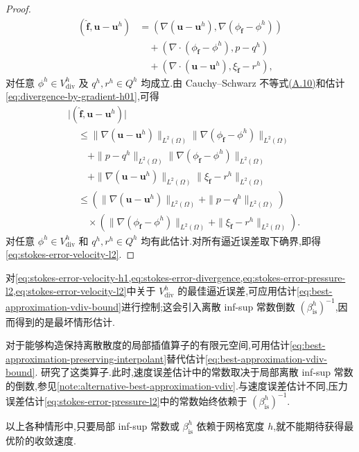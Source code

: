 \begin{proof}
\begin{equation}
\begin{aligned}
  (\widehat{\bm{f}},\bm{u}-\bm{u}^h)
  &= (\nabla(\bm{u}-\bm{u}^h),
      \nabla(\phi_{\widehat{\bm{f}}}-\phi^h))\\
  &\quad +(\nabla\cdot(\phi_{\widehat{\bm{f}}}
                    -\phi^h),p-q^h)\\
  &\quad +(\nabla\cdot(\bm{u}-\bm{u}^h),
           \xi_{\widehat{\bm{f}}}-r^h),
\end{aligned}
\end{equation}
对任意 $\phi^h\in V_{\mathrm{div}}^h$ 及 $q^h,r^h\in Q^h$ 均成立.由 Cauchy--Schwarz 不等式\hyperref[eq:appendix-a-10]{(A.10)}和估计\cref{eq:divergence-by-gradient-h01},可得
\begin{equation}\label{eq:stokes-error-velocity-l2-bound}
\begin{aligned}
  &\bigl|(\widehat{\bm{f}},\bm{u}-\bm{u}^h)\bigr|\\
  &\quad\leq
    \|\nabla(\bm{u}-\bm{u}^h)\|_{L^2(\Omega)}
      \|\nabla(\phi_{\widehat{\bm{f}}}
                    -\phi^h)\|_{L^2(\Omega)}\\
  &\qquad+\|p-q^h\|_{L^2(\Omega)}
      \|\nabla(\phi_{\widehat{\bm{f}}}
                    -\phi^h)\|_{L^2(\Omega)}\\
  &\qquad+\|\nabla(\bm{u}-\bm{u}^h)\|_{L^2(\Omega)}
      \|\xi_{\widehat{\bm{f}}}-r^h\|_{L^2(\Omega)}\\
  &\quad\leq
    \left(
      \|\nabla(\bm{u}-\bm{u}^h)\|_{L^2(\Omega)}
      +\|p-q^h\|_{L^2(\Omega)}
    \right)\\
  &\qquad\times
    \left(
      \|\nabla(\phi_{\widehat{\bm{f}}}
                    -\phi^h)\|_{L^2(\Omega)}
      +\|\xi_{\widehat{\bm{f}}}-r^h\|_{L^2(\Omega)}
    \right).
\end{aligned}
\end{equation}
对任意 $\phi^h\in V_{\mathrm{div}}^h$ 和 $q^h,r^h\in Q^h$ 均有此估计.对所有逼近误差取下确界,即得\cref{eq:stokes-error-velocity-l2}.
\end{proof}

\begin{note}\label{note:stokes-error-infsup-dependency}
对\cref{eq:stokes-error-velocity-h1,eq:stokes-error-divergence,eq:stokes-error-pressure-l2,eq:stokes-error-velocity-l2}中关于 $V_{\mathrm{div}}^h$ 的最佳逼近误差,可应用估计\cref{eq:best-approximation-vdiv-bound}进行控制;这会引入离散 inf-sup 常数倒数 $(\beta_{\mathrm{is}}^h)^{-1}$,因而得到的是最坏情形估计.

对于能够构造保持离散散度的局部插值算子的有限元空间,可用估计\cref{eq:best-approximation-preserving-interpolant}替代估计\cref{eq:best-approximation-vdiv-bound}.\textcite{GiraultScott2003} 研究了这类算子.此时,速度误差估计中的常数取决于局部离散 inf-sup 常数的倒数,参见\cref{note:alternative-best-approximation-vdiv}.与速度误差估计不同,压力误差估计\cref{eq:stokes-error-pressure-l2}中的常数始终依赖于 $(\beta_{\mathrm{is}}^h)^{-1}$.

以上各种情形中,只要局部 inf-sup 常数或 $\beta_{\mathrm{is}}^h$ 依赖于网格宽度 $h$,就不能期待获得最优阶的收敛速度.
\end{note}

